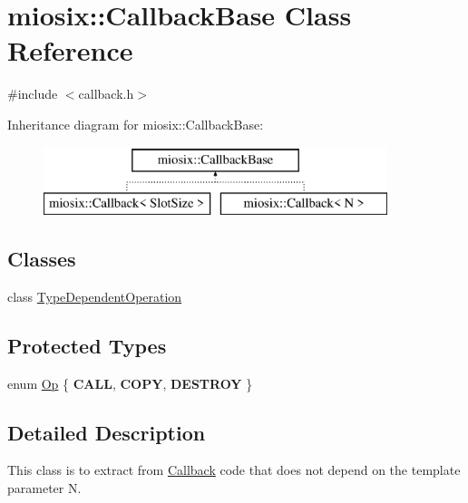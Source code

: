 \hypertarget{classmiosix_1_1_callback_base}{\section{miosix\-:\-:Callback\-Base Class Reference}
\label{classmiosix_1_1_callback_base}
}


{\ttfamily \#include $<$callback.\-h$>$}

Inheritance diagram for miosix\-:\-:Callback\-Base\-:\begin{figure}[H]
\begin{center}
\leavevmode
\includegraphics[height=2.000000cm]{classmiosix_1_1_callback_base}
\end{center}
\end{figure}
\subsection*{Classes}
\begin{DoxyCompactItemize}
\item 
class \hyperlink{classmiosix_1_1_callback_base_1_1_type_dependent_operation}{Type\-Dependent\-Operation}
\end{DoxyCompactItemize}
\subsection*{Protected Types}
\begin{DoxyCompactItemize}
\item 
enum \hyperlink{classmiosix_1_1_callback_base_a8f24acb613ae030f034ff390a265141b}{Op} \{ {\bfseries C\-A\-L\-L}, 
{\bfseries C\-O\-P\-Y}, 
{\bfseries D\-E\-S\-T\-R\-O\-Y}
 \}
\end{DoxyCompactItemize}


\subsection{Detailed Description}
This class is to extract from \hyperlink{classmiosix_1_1_callback}{Callback} code that does not depend on the template parameter N. 

